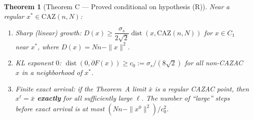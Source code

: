 \documentclass[11pt]{article}
\theoremstyle{plain}
\newtheorem{theorem}{Theorem}[section]
\theoremstyle{definition}
\theoremstyle{remark}
\newcommand{\CAZ}{\mathrm{CAZ}}
\newcommand{\dist}{\operatorname{dist}}
\begin{document}
\begin{theorem}[Theorem C --- Proved conditional on hypothesis (R)]\label{thm:C}
Near a regular $x^*\in\CAZ(n,N)$:
\begin{enumerate}
\item[\rm(a)] \emph{Sharp (linear) growth:}
$D(x)\ge\dfrac{\sigma_s}{2\sqrt2}\dist(x,\CAZ(n,N))$ for $x\in C_1$ near
$x^*$, where $D(x)=Nn-\|x\|^2$.
\item[\rm(b)] \emph{KL exponent $0$:}
$\dist(0,\partial F(x))\ge c_0:=\sigma_s/(8\sqrt2)$ for all non-CAZAC $x$
in a neighborhood of $x^*$.
\item[\rm(c)] \emph{Finite exact arrival:} if the Theorem~A limit $\bar x$
is a regular CAZAC point, then $x^\ell=\bar x$ \textbf{exactly} for all
sufficiently large $\ell$. The number of ``large'' steps before exact
arrival is at most $(Nn-\|x^0\|^2)/c_0^2$.
\end{enumerate}
\end{theorem}
\end{document}
